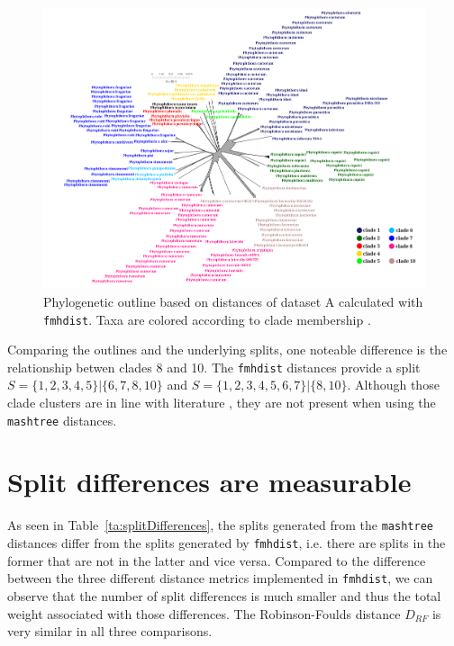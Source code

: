 \begin{figure}
  \centering
  \includegraphics[width=1.0\textwidth]{figures/fmhdist_mandal_outline_k21_s2000.png}
  \caption{Phylogenetic outline based on distances of dataset A calculated with
  \texttt{fmhdist}. Taxa are colored according to clade membership
  \cite{abadPhytophthoraTaxonomicPhylogenetic2023a}.}
  \label{fig:mandalFmhdistOutline}
\end{figure}

Comparing the outlines and the underlying splits, one noteable difference is the
relationship betwen clades 8 and 10. The \texttt{fmhdist} distances provide a
split $S= \{1, 2, 3, 4, 5\} | \{6, 7, 8, 10\}$ and $S= \{1, 2, 3, 4, 5, 6, 7\} |
\{8, 10\}$. Although those clade clusters are in line with literature
\cite{yangExpandedPhylogenyGenus2017,abadPhytophthoraTaxonomicPhylogenetic2023a},
they are not present when using the \texttt{mashtree} distances.


\section{Split differences are measurable}
As seen in Table~\ref{ta:splitDifferences}, the splits generated from the
\texttt{mashtree} distances differ from the splits generated by
\texttt{fmhdist}, i.e. there are splits in the former that are not in the latter
and vice versa. Compared to the difference between the three different distance
metrics implemented in \texttt{fmhdist}, we can observe that the number of
split differences is much smaller and thus the total weight associated with
those differences. The Robinson-Foulds distance $D_{RF}$ is very similar in all
three comparisons.

